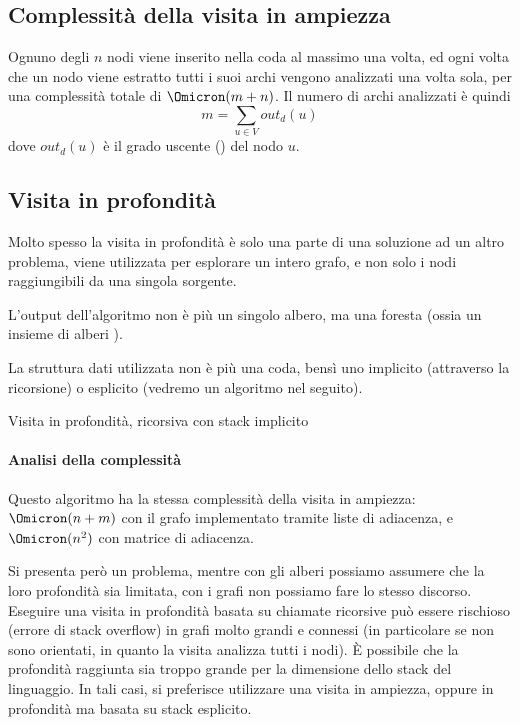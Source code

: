 \subsection{Complessità della visita in ampiezza}

Ognuno degli \(n\) nodi viene inserito nella coda al massimo una volta, ed ogni volta che un nodo viene estratto tutti i suoi archi vengono analizzati una volta sola, per una complessità totale di \(\Omicron(m+n)\).
Il numero di archi analizzati è quindi
\[
	m = \sum_{u \in V} \mathit{out}_d(u)
\]
dove \(\mathit{out}_d(u)\) è il grado uscente () del nodo \(u\).


\subsection{Visita in profondità}

Molto spesso la visita in profondità è solo una parte di una soluzione ad un altro problema, viene utilizzata per esplorare un intero grafo, e non solo i nodi raggiungibili da una singola sorgente.

L'output dell'algoritmo non è più un singolo albero, ma una foresta  (ossia un insieme di alberi ).

La struttura dati utilizzata non è più una coda, bensì uno  implicito (attraverso la ricorsione) o esplicito (vedremo un algoritmo nel seguito).

\begin{algorithm}[H]
	\caption{Visita in profondità, ricorsiva con stack implicito}
	
\end{algorithm}

\paragraph{Analisi della complessità}
Questo algoritmo ha la stessa complessità della visita in ampiezza: \(\Omicron(n+m)\) con il grafo implementato tramite liste di adiacenza, e \(\Omicron(n^2)\) con matrice di adiacenza.

Si presenta però un problema, mentre con gli alberi possiamo assumere che la loro profondità sia limitata, con i grafi non possiamo fare lo stesso discorso.
Eseguire una visita in profondità basata su chiamate ricorsive può essere rischioso (errore di \textsf{stack overflow}) in grafi molto grandi e connessi (in particolare se non sono orientati, in quanto la visita analizza tutti i nodi).
\`{E} possibile che la profondità raggiunta sia troppo grande per la dimensione dello stack del linguaggio.
In tali casi, si preferisce utilizzare una visita in ampiezza, oppure in profondità ma basata su stack esplicito.

